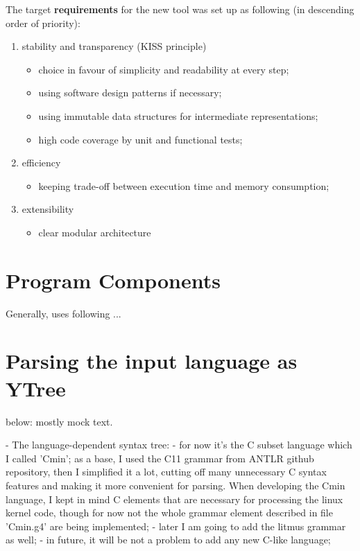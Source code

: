 The target \textbf{requirements} for the new tool was set up as following (in descending order of priority):

\begin{enumerate}[nolistsep]
        \item stability and transparency (KISS principle)
                \begin{itemize}
                        \item choice in favour of simplicity and readability at every step;
                        \item using software design patterns if necessary;
                        \item using immutable data structures for intermediate representations;
                        \item high code coverage by unit and functional tests;
                \end{itemize}                
        \item efficiency
                \begin{itemize}
                        \item keeping trade-off between execution time and memory consumption;
                \end{itemize}
        \item extensibility
                \begin{itemize}
                        \item clear modular architecture
                \end{itemize}
\end{enumerate}

\section{Program Components}
\label{ch:impl:comp}

Generally, \mousquetaires uses following  ...

\section{Parsing the input language as YTree}
\label{ch:impl:ytree}

below: mostly mock text.

- The language-dependent syntax tree:
        - for now it's the C subset language which I called 'Cmin'; as a base, I used the C11 grammar from ANTLR github repository, then I simplified it a lot, cutting off many unnecessary C syntax features and making it more convenient for parsing. When developing the Cmin language, I kept in mind C elements that are necessary for processing the linux kernel code, though for now not the whole grammar element described in file 'Cmin.g4' are being implemented;
        - later I am going to add the litmus grammar as well;
        - in future, it will be not a problem to add any new C-like language;

